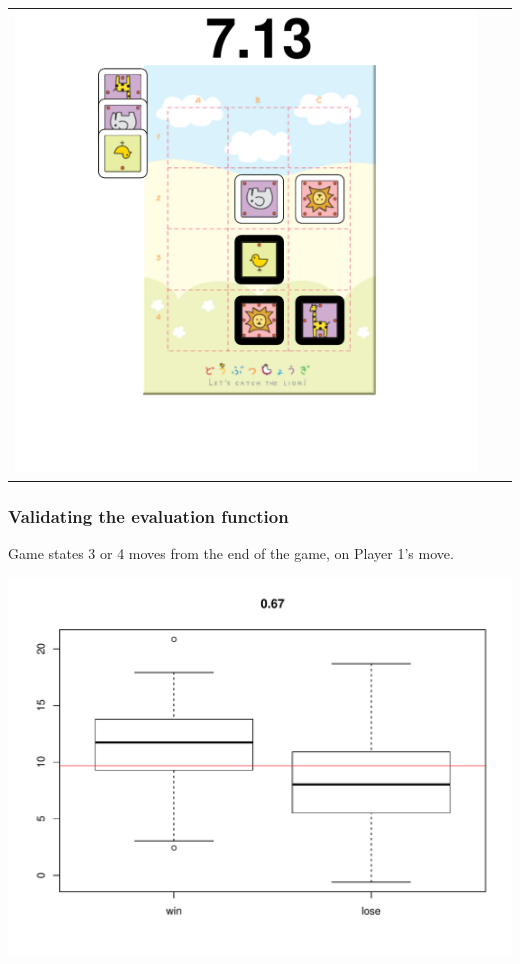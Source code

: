 \documentclass{beamer}
\begin{document}
\begin{frame}
\begin{tabular}{ccc}
\includegraphics[scale = 0.15]{val6.pdf}\\
\end{tabular}
\end{frame}


\begin{frame}
\frametitle{Validating the evaluation function}
Game states 3 or 4 moves from the end of the game, on Player 1's move.
\begin{center}
\includegraphics[scale = 0.4]{validation.pdf}
\end{center}
\end{frame}
\end{document}
